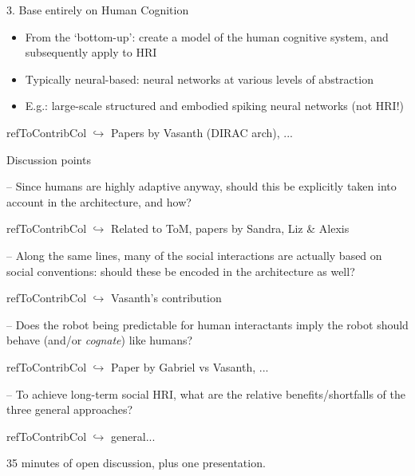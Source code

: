 \documentclass[compress]{beamer}
\newcommand{\refToContrib}[1]{%
    \begin{beamercolorbox}[wd=\linewidth,ht=2ex,dp=0.7ex]{refToContribCol}%
    \hspace{0.5em}$\hookrightarrow$ #1%
    \end{beamercolorbox}%
}%
\begin{document}
\begin{frame}{3. Base entirely on Human Cognition}

	\begin{itemize}
		\item From the `bottom-up': create a model of the human cognitive system, and subsequently apply to HRI
		\item Typically neural-based: neural networks at various levels of abstraction
        \item E.g.: large-scale structured and embodied spiking neural networks \cite{Krichmar2002} \footnotesize{(not HRI!)}
    \end{itemize}
    
    \refToContrib{Papers by Vasanth (DIRAC arch), ...}

\end{frame}


\begin{frame}{Discussion points}
    
	-- Since humans are highly adaptive anyway, should this be explicitly taken into account in the architecture, and how?
	\refToContrib{Related to ToM, papers by Sandra, Liz \& Alexis}

	-- Along the same lines, many of the social interactions are actually based
	on social conventions: should these be encoded in the architecture as well?
    \refToContrib{Vasanth's contribution}
	
	-- Does the robot being predictable for human interactants imply the robot should behave (and/or \textit{cognate}) like humans?
	\refToContrib{Paper by Gabriel vs Vasanth, ...}
	
	-- To achieve long-term social HRI, what are the relative benefits/shortfalls of the three general approaches?
	\refToContrib{general...}
	
	\vspace{0.5cm}

    35 minutes of open discussion, plus one presentation.

\end{frame}
\end{document}
